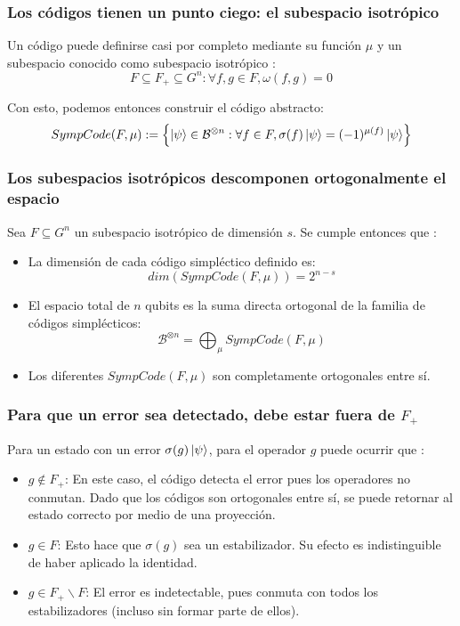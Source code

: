 \begin{frame}
  \frametitle{Los códigos tienen un punto ciego: el subespacio isotrópico}
  Un código puede definirse casi por completo mediante su función $\mu$ y un subespacio conocido como subespacio isotrópico \citep{Kitaev2002}:
  \begin{equation}
    F \subseteq F_+ \subseteq G^n : \forall f, g \in F, \omega(f, g) = 0
    \label{eq:isotropic}
  \end{equation}

  Con esto, podemos entonces construir el código abstracto:
  \begin{equation}
    SympCode(F, \mu) := \left\{\ket{\psi} \in \mathcal{B}^{\otimes n} : \forall f \in F, \sigma(f) \ket{\psi} = (-1)^{\mu(f)}\ket{\psi}\right\}
    \label{eq:simp_abst}
  \end{equation}

\end{frame}

\begin{frame}
  \frametitle{Los subespacios isotrópicos descomponen ortogonalmente el espacio}
  Sea $F \subseteq G^n$ un subespacio isotrópico de dimensión $s$. Se cumple entonces que \citep{Kitaev2002}:
  \begin{itemize}
    \item La dimensión de cada código simpléctico definido es:
      $$dim(SympCode(F, \mu)) = 2^{n - s}$$
    \item El espacio total de $n$ qubits es la suma directa ortogonal de la familia de códigos simplécticos:
      $$\mathcal{B}^{\otimes n} = \bigoplus_{\mu} SympCode(F, \mu)$$
    \item Los diferentes $SympCode(F, \mu)$ son completamente ortogonales entre sí.
  \end{itemize}
\end{frame}

\begin{frame}
  \frametitle{Para que un error sea detectado, debe estar fuera de $F_+$}

  Para un estado con un error $\sigma(g)\ket{\psi}$, para el operador $g$ puede ocurrir que \citep{Kitaev2002}:
  \begin{itemize}
    \item $g \not\in F_+$: En este caso, el código detecta el error pues los operadores no conmutan. Dado que los códigos son ortogonales entre sí, se puede retornar al estado correcto por medio de una proyección.
    \item $g \in F$: Esto hace que $\sigma(g)$ sea un estabilizador. Su efecto es indistinguible de haber aplicado la identidad.
    \item $g \in F_+ \backslash F$: El error es indetectable, pues conmuta con todos los estabilizadores (incluso sin formar parte de ellos).
  \end{itemize}
\end{frame}
